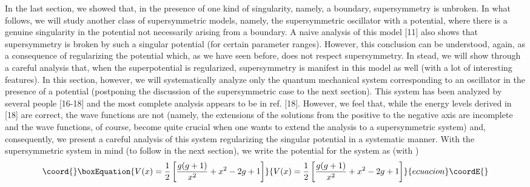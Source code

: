 \documentclass[a4paper,11pt]{article}
\begin{document}
In the last section, we showed that, in the presence of one kind of
singularity, namely, a boundary, supersymmetry is unbroken. In what
follows, we will study another class of supersymmetric models, namely,
the supersymmetric oscillator with a \coordHE{} potential, where
there is a genuine singularity in the potential not necessarily
arising  from a boundary. A naive analysis of this model [11] also
shows that supersymmetry is broken by such a singular potential (for
certain parameter ranges). However, this conclusion can be understood,
again, as a consequence of regularizing the potential
which, as we have seen before, does not respect supersymmetry. In
stead, we will show through a careful analysis that,
when the superpotential is regularized, supersymmetry is manifest in
this model as well (with a lot of interesting features).  
In this section, however, we will systematically analyze only the quantum
mechanical system corresponding to an oscillator in the presence of a
\coordHE{} potential (postponing the discussion of the
supersymmetric  case to the next section). This system has been
analyzed  by several people [16-18]  and
the most complete analysis appears to be in ref. [18]. However, we feel
that, while the energy levels derived in [18] are correct, the wave
functions are not (namely, the extensions of the solutions from the
positive to the negative axis are incomplete and the wave functions,
of course, become quite crucial  when one
wants to extend the analysis to a supersymmetric system) and,
consequently, we  present a careful analysis of this system
regularizing the singular potential in a systematic manner. With the
supersymmetric system in mind (to follow in the next section), we
write the potential for the system as (with \coordHE{})
\begin{equation}\coord{}\boxEquation{
V(x) = {1\over 2}\left[\frac{g(g+1)}{x^{2}} + x^{2} - 2g +
1\right]\label{c1}
}{
V(x) = {1\over 2}\left[\frac{g(g+1)}{x^{2}} + x^{2} - 2g +
1\right]}{ecuacion}\coordE{}\end{equation}
\end{document}
